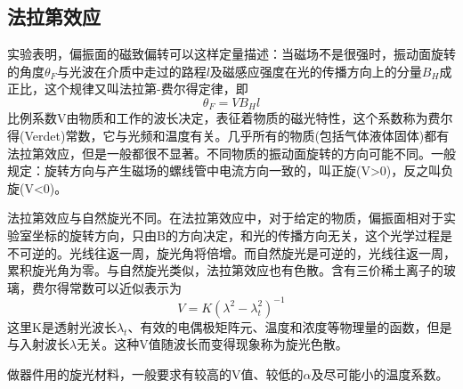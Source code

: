\documentclass[a4paper]{article}
\begin{document}
\subsection{法拉第效应}
实验表明，偏振面的磁致偏转可以这样定量描述：当磁场不是很强时，振动面旋转的角度$\theta_F$与光波在介质中走过的路程$l$及磁感应强度在光的传播方向上的分量$B_H$成正比，这个规律又叫法拉第-费尔得定律，即
\begin{equation}
\theta_F = VB_Hl\label{eq1}
\end{equation}
比例系数V由物质和工作的波长决定，表征着物质的磁光特性，这个系数称为费尔得(Verdet)常数，它与光频和温度有关。几乎所有的物质(包括气体液体固体)都有法拉第效应，但是一般都很不显著。不同物质的振动面旋转的方向可能不同。一般规定：旋转方向与产生磁场的螺线管中电流方向一致的，叫正旋(V>0)，反之叫负旋(V<0)。

法拉第效应与自然旋光不同。在法拉第效应中，对于给定的物质，偏振面相对于实验室坐标的旋转方向，只由B的方向决定，和光的传播方向无关，这个光学过程是不可逆的。光线往返一周，旋光角将倍增。而自然旋光是可逆的，光线往返一周，累积旋光角为零。与自然旋光类似，法拉第效应也有色散。含有三价稀土离子的玻璃，费尔得常数可以近似表示为
\begin{equation}
V = K(\lambda^2 - \lambda_t^2)^{-1}\label{eq2}
\end{equation}
这里K是透射光波长$\lambda_t$、有效的电偶极矩阵元、温度和浓度等物理量的函数，但是与入射波长$\lambda$无关。这种V值随波长而变得现象称为旋光色散。

做器件用的旋光材料，一般要求有较高的V值、较低的$\alpha$及尽可能小的温度系数。
\end{document}
